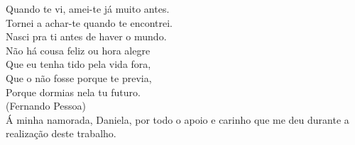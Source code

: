
\null\vskip5cm%
\begin{flushright}
     Quando te vi, amei-te já muito antes.\\
     Tornei a achar-te quando te encontrei.\\
     Nasci pra ti antes de haver o mundo.\\
     Não há cousa feliz ou hora alegre\\
     Que eu tenha tido pela vida fora,\\
     Que o não fosse porque te previa,\\
     Porque dormias nela tu futuro.\\
     (Fernando Pessoa) \\
     Á minha namorada, Daniela, por todo o apoio e carinho que me deu durante a realização deste trabalho.
\end{flushright}
\vfill\newpage

